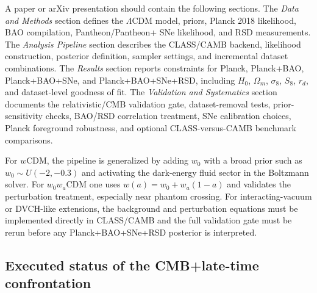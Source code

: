 \documentclass[pdflatex,sn-mathphys-num]{sn-jnl}%
\begin{document}
A paper or arXiv presentation should contain the following sections. The
\emph{Data and Methods} section defines the $\Lambda$CDM model, priors, Planck
2018 likelihood, BAO compilation, Pantheon/Pantheon+ SNe likelihood, and RSD
measurements. The \emph{Analysis Pipeline} section describes the CLASS/CAMB
backend, likelihood construction, posterior definition, sampler settings, and
incremental dataset combinations. The \emph{Results} section reports constraints
for Planck, Planck+BAO, Planck+BAO+SNe, and Planck+BAO+SNe+RSD, including
$H_0$, $\Omega_m$, $\sigma_8$, $S_8$, $r_d$, and dataset-level goodness of fit.
The \emph{Validation and Systematics} section documents the relativistic/CMB
validation gate, dataset-removal tests, prior-sensitivity checks, BAO/RSD
correlation treatment, SNe calibration choices, Planck foreground robustness,
and optional CLASS-versus-CAMB benchmark comparisons.

For $w$CDM, the pipeline is generalized by adding $w_0$ with a broad prior such
as $w_0\sim U(-2,-0.3)$ and activating the dark-energy fluid sector in the
Boltzmann solver. For $w_0w_a$CDM one uses $w(a)=w_0+w_a(1-a)$ and validates the
perturbation treatment, especially near phantom crossing. For interacting-vacuum
or DVCH-like extensions, the background and perturbation equations must be
implemented directly in CLASS/CAMB and the full validation gate must be rerun
before any Planck+BAO+SNe+RSD posterior is interpreted.


\subsection{Executed status of the CMB+late-time confrontation}
\label{subsec:requested_full_pipeline_execution}
\end{document}
